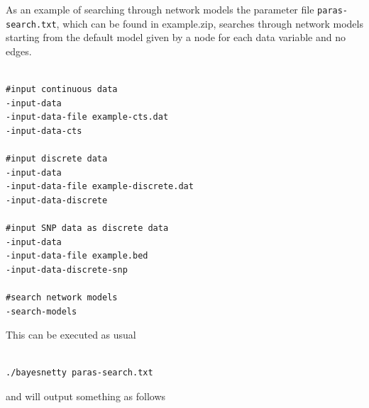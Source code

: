 \documentclass[a4paper,12pt]{article}
\newcommand{\code}[1]{{\footnotesize{{\tt #1}}}}
\begin{document}
As an example of searching through network models the parameter file \code{paras-search.txt}, which can be found in example.zip, searches through network models starting from the default model given by a node for each data variable and no edges. 
\vspace{0.35cm} \begin{lstlisting}

#input continuous data
-input-data
-input-data-file example-cts.dat
-input-data-cts

#input discrete data
-input-data
-input-data-file example-discrete.dat
-input-data-discrete

#input SNP data as discrete data
-input-data
-input-data-file example.bed
-input-data-discrete-snp

#search network models
-search-models

\end{lstlisting} \vspace{0.35cm}
This can be executed as usual 
\vspace{0.35cm} \begin{lstlisting}

./bayesnetty paras-search.txt

\end{lstlisting} \vspace{0.35cm}
and will output something as follows 
\end{document}
